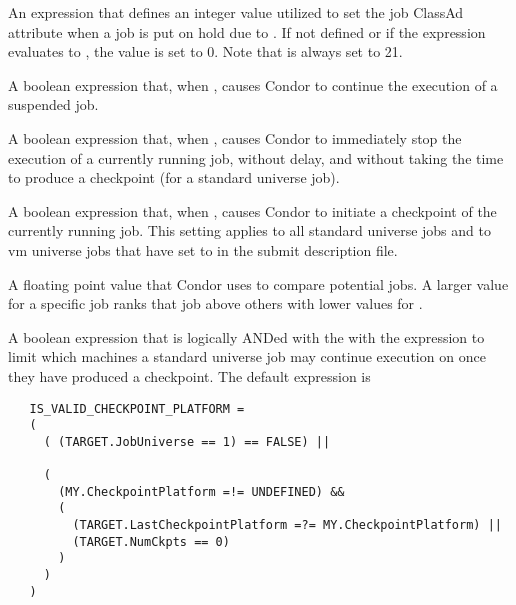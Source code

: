\begin{description}
\label{param:WantHoldSubcode}
\item[\Macro{WANT\_HOLD\_SUBCODE}]
  An expression that defines an integer value utilized to set the job ClassAd
  attribute   when a job is put on hold due to
  .
  If not defined or if the expression evaluates to ,
  the value is set to 0.
  Note that  is always set to 21.

\label{param:Continue}
\item[\Macro{CONTINUE}]
  A boolean expression that, when ,
  causes Condor to continue the execution of a suspended job.

\label{param:Kill}
\item[\Macro{KILL}]
  A boolean expression that, when ,
  causes Condor to immediately stop the
  execution of a currently running job, without delay, and
  without taking the time to produce a checkpoint (for a standard
  universe job).

\label{param:PeriodicCheckpoint}
\item[\Macro{PERIODIC\_CHECKPOINT}]
  A boolean expression that, when , causes Condor to
  initiate a checkpoint of the currently running job. This setting
  applies to all standard universe jobs and to vm universe jobs
  that have set  to 
  in the submit description file.

\label{param:Rank}
\item[\Macro{RANK}]
  A floating point value that Condor uses to compare potential jobs.
  A larger value for a specific job ranks that job above
  others with lower values for .

\label{param:IsValidCheckpointPlatform}
\item[\Macro{IS\_VALID\_CHECKPOINT\_PLATFORM}]
  A boolean expression that is logically ANDed with the
  with the  expression to limit which machines a
  standard universe job may continue execution on once they have
  produced a checkpoint.
  The default expression is

   \footnotesize
   \begin{verbatim}
   IS_VALID_CHECKPOINT_PLATFORM =
   (
     ( (TARGET.JobUniverse == 1) == FALSE) ||
   
     (
       (MY.CheckpointPlatform =!= UNDEFINED) &&
       (
         (TARGET.LastCheckpointPlatform =?= MY.CheckpointPlatform) ||
         (TARGET.NumCkpts == 0)
       )
     )
   )
   \end{verbatim}
   \normalsize


\end{description}
